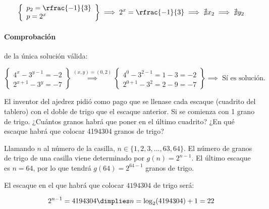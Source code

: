 \documentclass[palatino,nosec,nochap,nobuilddate]{Docencia}
\begin{document}
\begin{problem}
\[
	\left\{
			\begin{array}{l}
				p_2 = \rfrac{-1}{3}\\
				p = 2^x
			\end{array}
	\right\} \implies 2^x = \rfrac{-1}{3} \implies \nexists x_2 \implies \nexists y_2 
\]

\paragraph{Comprobación} de la única solución válida:

\[
	\left\{
		\begin{array}{l}
			4^x-3^{y-1}=-2\\
			2^{x+1}-3^y=-7
		\end{array}
	\right\} \overset{(x,y)=(0,2)}{\implies} 
	\left\{
		\begin{array}{l}
			4^0-3^{2-1}= 1-3 = -2\\
			2^{0+1}-3^2= 2-9 = -7 
		\end{array}
	\right\} \implies\text{ Sí es solución.}
\]

\end{problem}

\begin{problem}
El inventor del ajedrez pidió como pago que se llenase cada escaque (cuadrito del tablero) con el doble de trigo que el escaque anterior. Si se comienza con 1 grano de trigo. ¿Cuántos granos habrá que poner en el último cuadrito? ¿En qué escaque habrá que colocar 4194304 granos de trigo?
\solution

Llamando $n$ al número de la casilla, $n\in\{1,2,3,...,63,64\}$.
%
El número de granos de trigo de una casilla viene determinado por $g(n) = 2^{n-1}$.
%
El último escaque es $n=64$, por lo que tendrá $g(64) = 2^{64-1}$ granos de trigo.

El escaque en el que habrá que colocar $4194304$ de trigo será: 

\[
	2^{n-1} = 4194304 \dimplies n=\log_2 (4194304) + 1 = 22
\]

\end{problem}
\end{document}
